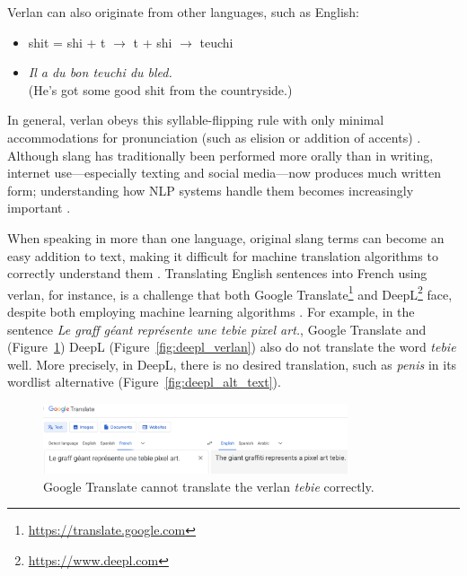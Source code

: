 \documentclass[12pt]{article}
\begin{document}
\noindent Verlan can also originate from other languages, such as English:

\begin{flushleft}
\small
\begin{itemize}
  \item shit = shi + t \(\rightarrow\) t + shi \(\rightarrow\) teuchi \cite{evolutionverlan}
  \item \textit{Il a du bon teuchi du bled.}\\(He's got some good shit from the countryside.)
\end{itemize}
\end{flushleft}

\noindent In general, verlan obeys this syllable-flipping rule with only minimal accommodations for pronunciation (such as elision or addition of accents) \cite{rajabov2025}. Although slang has traditionally been performed more orally than in writing, internet use\;---\;especially texting and social media\;---\;now produces much written form; understanding how NLP systems handle them becomes increasingly important \cite{rua2005}.

When speaking in more than one language, original slang terms can become an easy addition to text, making it difficult for machine translation algorithms to correctly understand them \cite{hajiyeva2025}. Translating English sentences into French using verlan, for instance, is a challenge that both Google Translate\footnote{\url{https://translate.google.com}} and DeepL\footnote{\url{https://www.deepl.com}} face, despite both employing machine learning algorithms \cite{deepl2020, wu2016}. For example, in the sentence \textit{Le graff géant représente une tebie pixel art.}, Google Translate and (Figure~\ref{fig:google_verlan}) DeepL (Figure~\ref{fig:deepl_verlan}) also do not translate the word \textit{tebie} well. More precisely, in DeepL, there is no desired translation, such as \textit{penis} in its wordlist alternative (Figure~\ref{fig:deepl_alt_text}).

\begin{figure}[H]
\centering
\includegraphics[width=0.8\textwidth]{figures/google_verlan.png}
\caption{\label{fig:google_verlan}Google Translate cannot translate the verlan \textit{tebie} correctly.}
\end{figure}
\end{document}
